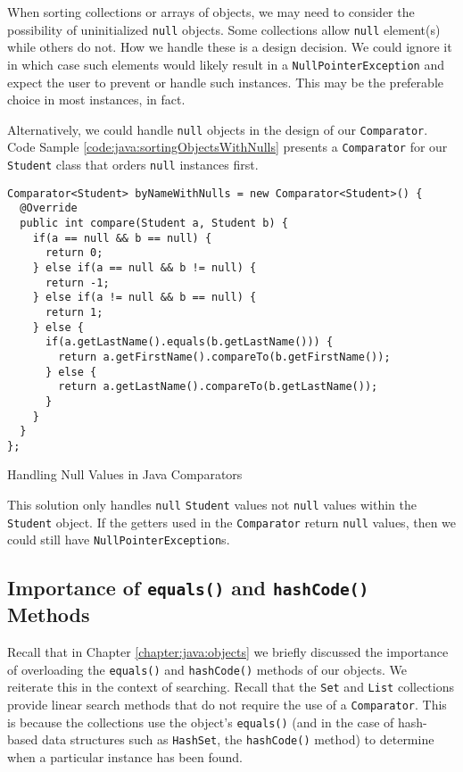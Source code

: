 When sorting collections or arrays of objects, we may need to consider 
the possibility of uninitialized \texttt{null} objects.  Some
collections allow \texttt{null} element(s) while others do not.
How we handle these is a design decision.  We could ignore it in which 
case such elements would likely result in a \texttt{NullPointerException} 
and expect the user to prevent or handle such instances.  This may be 
the preferable choice in most instances, in fact.

Alternatively, we could handle \texttt{null} objects in the 
design of our \texttt{Comparator}.  Code Sample 
\ref{code:java:sortingObjectsWithNulls} presents a \texttt{Comparator} 
for our \texttt{Student} class that orders \texttt{null}
instances first.

\begin{listing}[H]
\begin{verbatim}
Comparator<Student> byNameWithNulls = new Comparator<Student>() {
  @Override
  public int compare(Student a, Student b) {
    if(a == null && b == null) {
      return 0;
    } else if(a == null && b != null) {
      return -1;
    } else if(a != null && b == null) {
      return 1;
    } else {
      if(a.getLastName().equals(b.getLastName())) {
        return a.getFirstName().compareTo(b.getFirstName());
      } else {
        return a.getLastName().compareTo(b.getLastName());
      }
    }
  }
};
\end{verbatim}
\caption{Handling Null Values in Java Comparators}
\label{code:java:sortingObjectsWithNulls}
\end{listing}

This solution only handles \texttt{null} \texttt{Student}
values not \texttt{null} values within the \texttt{Student}
object.  If the getters used in the \texttt{Comparator} return
\texttt{null} values, then we could still have 
\texttt{NullPointerException}s.  


\subsection{Importance of \texttt{equals()} and \texttt{hashCode()} Methods}
\label{subsection:importanceOfEqualsHashCode}

Recall that in Chapter \ref{chapter:java:objects} we briefly discussed the
importance of overloading the \texttt{equals()} and 
\texttt{hashCode()} methods of our objects.  We reiterate this
in the context of searching.  Recall that the \texttt{Set} and
\texttt{List} collections provide linear search methods that do
not require the use of a \texttt{Comparator}.  This is because
the collections use the object's \texttt{equals()} (and in the
case of hash-based data structures such as \texttt{HashSet}, the
\texttt{hashCode()} method) to determine when a particular 
instance has been found.

